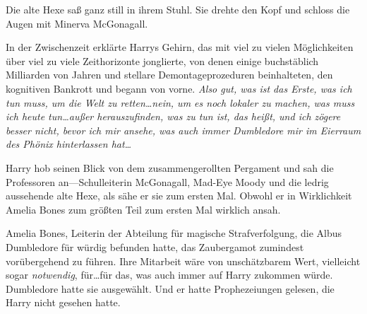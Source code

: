 Die alte Hexe saß ganz still in ihrem Stuhl. Sie drehte den Kopf und schloss die Augen mit Minerva McGonagall.

In der Zwischenzeit erklärte Harrys Gehirn, das mit viel zu vielen Möglichkeiten über viel zu viele Zeithorizonte jonglierte, von denen einige buchstäblich Milliarden von Jahren und stellare Demontageprozeduren beinhalteten, den kognitiven Bankrott und begann von vorne.
\emph{Also gut, was ist das \emph{Erste}, was ich tun muss, um die Welt zu retten…nein, um es noch lokaler zu machen, was muss ich heute tun…außer herauszufinden, was zu tun ist, das heißt, und ich zögere besser nicht, bevor ich mir ansehe, was auch immer Dumbledore mir im Eierraum des Phönix hinterlassen hat…}

Harry hob seinen Blick von dem zusammengerollten Pergament und sah die Professoren an—Schulleiterin McGonagall, Mad-Eye Moody und die ledrig aussehende alte Hexe, als sähe er sie zum ersten Mal. Obwohl er in Wirklichkeit Amelia Bones zum größten Teil zum ersten Mal wirklich ansah.

Amelia Bones, Leiterin der Abteilung für magische Strafverfolgung, die Albus Dumbledore für würdig befunden hatte, das Zaubergamot zumindest vorübergehend zu führen. Ihre Mitarbeit wäre von unschätzbarem Wert, vielleicht sogar \emph{notwendig}, für…für das, was auch immer auf Harry zukommen würde. Dumbledore hatte sie ausgewählt. Und er hatte Prophezeiungen gelesen, die Harry nicht gesehen hatte.

